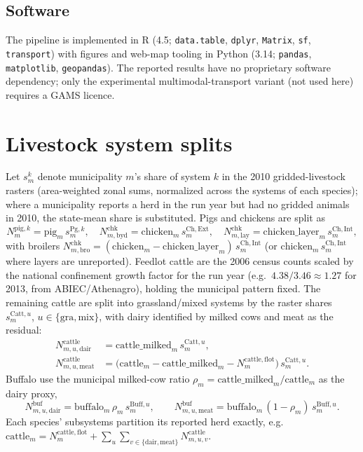 \documentclass[pdflatex,sn-nature]{sn-jnl}%
\begin{document}
\subsection{Software}\label{subsec:software}
The pipeline is implemented in R (4.5; \texttt{data.table}, \texttt{dplyr},
\texttt{Matrix}, \texttt{sf}, \texttt{transport}) with figures and
web-map tooling in Python (3.14; \texttt{pandas}, \texttt{matplotlib},
\texttt{geopandas}). The reported results have no proprietary software
dependency; only the experimental multimodal-transport variant (not used
here) requires a GAMS licence.

\appendix
\section{Livestock system splits}\label{app:livestock}
Let $s^{k}_m$ denote municipality $m$'s share of system $k$ in the 2010
gridded-livestock rasters (area-weighted zonal sums, normalized across the
systems of each species); where a municipality reports a herd in the run year
but had no gridded animals in 2010, the state-mean share is substituted. Pigs
and chickens are split as
\begin{equation}
  N^{\mathrm{pig},k}_m=\text{pig}_m\,s^{\mathrm{Pg},k}_m,\quad
  N^{\mathrm{chk}}_{m,\mathrm{byd}}=\text{chicken}_m\,s^{\mathrm{Ch,Ext}}_m,\quad
  N^{\mathrm{chk}}_{m,\mathrm{lay}}=\text{chicken\_layer}_m\,s^{\mathrm{Ch,Int}}_m,
\end{equation}
with broilers
$N^{\mathrm{chk}}_{m,\mathrm{bro}}=(\text{chicken}_m-\text{chicken\_layer}_m)\,s^{\mathrm{Ch,Int}}_m$
(or $\text{chicken}_m\,s^{\mathrm{Ch,Int}}_m$ where layers are unreported).
Feedlot cattle are the 2006 census counts scaled by the national confinement
growth factor for the run year (e.g.\ $4.38/3.46\approx1.27$ for 2013, from
ABIEC/Athenagro), holding the municipal pattern fixed. The remaining cattle
are split into grassland/mixed systems by the raster shares
$s^{\mathrm{Catt},u}_m$, $u\in\{\mathrm{gra,mix}\}$, with dairy identified by
milked cows and meat as the residual:
\begin{align}
  N^{\mathrm{cattle}}_{m,u,\mathrm{dair}}&=\text{cattle\_milked}_m\,s^{\mathrm{Catt},u}_m,\\
  N^{\mathrm{cattle}}_{m,u,\mathrm{meat}}&=\big(\text{cattle}_m-\text{cattle\_milked}_m-N^{\mathrm{cattle,flot}}_m\big)\,s^{\mathrm{Catt},u}_m .
\end{align}
Buffalo use the municipal milked-cow ratio
$\rho_m=\text{cattle\_milked}_m/\text{cattle}_m$ as the dairy proxy,
\begin{equation}
  N^{\mathrm{buf}}_{m,u,\mathrm{dair}}=\text{buffalo}_m\,\rho_m\,s^{\mathrm{Buff},u}_m,
  \qquad
  N^{\mathrm{buf}}_{m,u,\mathrm{meat}}=\text{buffalo}_m\,(1-\rho_m)\,s^{\mathrm{Buff},u}_m .
\end{equation}
Each species' subsystems partition its reported herd exactly, e.g.\
$\text{cattle}_m=N^{\mathrm{cattle,flot}}_m+\sum_{u}\sum_{v\in\{\mathrm{dair,meat}\}}N^{\mathrm{cattle}}_{m,u,v}$.

%
\end{document}
